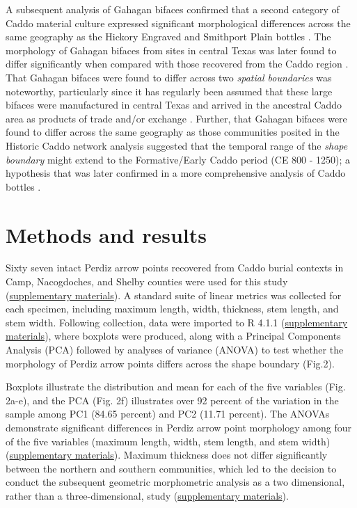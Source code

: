 \documentclass[smallextended]{svjour3}       %
\begin{document}
A subsequent analysis of Gahagan bifaces confirmed that a second
category of Caddo material culture expressed significant morphological
differences across the same geography as the Hickory Engraved and
Smithport Plain bottles \cite{RN8158}. The morphology of Gahagan bifaces
from sites in central Texas was later found to differ significantly when
compared with those recovered from the Caddo region \cite{RN8322}. That
Gahagan bifaces were found to differ across two \emph{spatial
boundaries} was noteworthy, particularly since it has regularly been
assumed that these large bifaces were manufactured in central Texas and
arrived in the ancestral Caddo area as products of trade and/or exchange
\cite{RN8322,RN8158}. Further, that Gahagan bifaces were found to differ
across the same geography as those communities posited in the Historic
Caddo network analysis suggested that the temporal range of the
\emph{shape boundary} might extend to the Formative/Early Caddo period
(CE 800 - 1250); a hypothesis that was later confirmed in a more
comprehensive analysis of Caddo bottles \cite{RN8312}.

\hypertarget{methods-and-results}{%
\section{Methods and results}\label{methods-and-results}}

Sixty seven intact Perdiz arrow points recovered from Caddo burial
contexts in Camp, Nacogdoches, and Shelby counties were used for this
study (\href{https://seldenlab.github.io/perdiz3/}{supplementary
materials}). A standard suite of linear metrics was collected for each
specimen, including maximum length, width, thickness, stem length, and
stem width. Following collection, data were imported to R 4.1.1
\cite{RN8584} (\href{https://seldenlab.github.io/perdiz3/}{supplementary
materials}), where boxplots were produced, along with a Principal
Components Analysis (PCA) followed by analyses of variance (ANOVA) to
test whether the morphology of Perdiz arrow points differs across the
shape boundary (Fig.2).

Boxplots illustrate the distribution and mean for each of the five
variables (Fig. 2a-e), and the PCA (Fig. 2f) illustrates over 92 percent
of the variation in the sample among PC1 (84.65 percent) and PC2 (11.71
percent). The ANOVAs demonstrate significant differences in Perdiz arrow
point morphology among four of the five variables (maximum length,
width, stem length, and stem width)
(\href{https://seldenlab.github.io/perdiz3/}{supplementary materials}).
Maximum thickness does not differ significantly between the northern and
southern communities, which led to the decision to conduct the
subsequent geometric morphometric analysis as a two dimensional, rather
than a three-dimensional, study
(\href{https://seldenlab.github.io/perdiz3/}{supplementary materials}).
\end{document}
